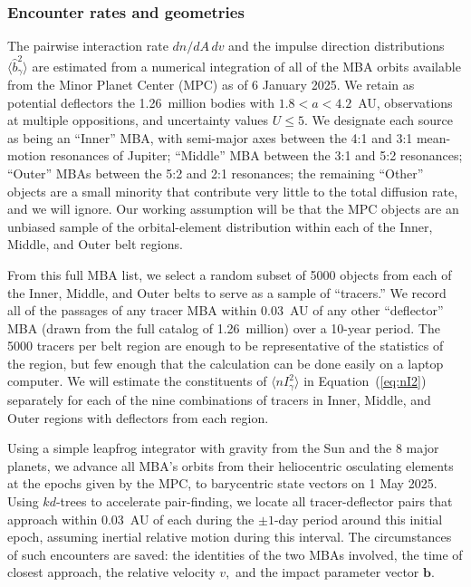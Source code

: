 \documentclass[linenumbers, onecolumn]{aastex631}
\newcommand{\eqq}[1]{Equation~(\ref{#1})}
\newcommand{\vecb}{\mathbf{b}}
\begin{document}
\subsubsection{Encounter rates and geometries}
The pairwise interaction rate $dn/dA\,dv$ and the impulse direction
distributions $\langle \hat b^2_\gamma \rangle$ are estimated from a
numerical integration of all of the MBA orbits available
from the Minor Planet Center (MPC) as of 6 January 2025.   We retain as
potential deflectors the 1.26~million bodies with $1.8<a<4.2$~AU,
observations at multiple oppositions, and uncertainty values $U\le5.$
We designate each source as being an ``Inner'' MBA, with semi-major axes between the 4:1 and 3:1
mean-motion resonances of Jupiter; ``Middle'' MBA between the 3:1 and
5:2 resonances; ``Outer'' MBAs between the 5:2 and 2:1
resonances; the remaining ``Other'' objects are a small minority that
contribute very little to the total diffusion rate, and we will ignore.  Our working
assumption will be that the MPC objects are an unbiased sample of the
orbital-element distribution within each of the Inner, Middle, and
Outer belt regions.

From this full MBA list, we select a random subset of 5000 objects
from each of the Inner, Middle, and Outer belts to serve as a sample
of ``tracers.''  We record all of the passages of any tracer MBA
within 0.03~AU of any other ``deflector'' MBA (drawn from the full
catalog of 1.26~million) over a 10-year period.  The 5000 tracers per
belt region are enough to be representative of the statistics of
the region, but few enough that the calculation can be done easily
on a laptop computer.
We will estimate the constituents of  $\langle nI_\gamma^2\rangle$ in
\eqq{eq:nI2} separately for each of the nine combinations of tracers
in Inner, Middle, and Outer regions with deflectors from each region.

Using a simple leapfrog integrator with gravity from the Sun and the 8
major planets, we advance all MBA's orbits from their heliocentric
osculating elements at the epochs given by the MPC, to barycentric
state vectors on 1 May 2025.  Using $kd$-trees to accelerate
pair-finding, we locate all tracer-deflector pairs
that approach within 0.03~AU of each during the $\pm1$-day period
around this initial epoch, assuming inertial relative motion during
this interval.  The circumstances of such encounters are saved: the
identities of the two MBAs involved, the time of closest approach, the
relative velocity $v,$ and the impact parameter vector $\vecb.$
\end{document}
